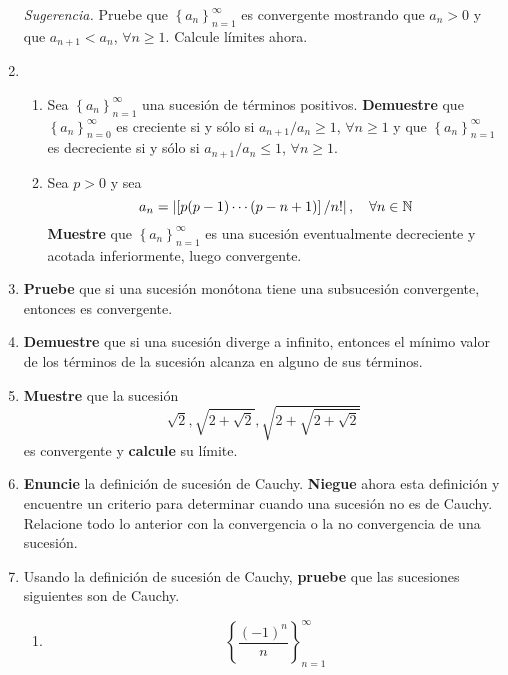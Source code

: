 \documentclass[12pt]{article}
\begin{document}
\begin{enumerate}
    \textit{Sugerencia.} Pruebe que $\left\{a_n\right\}_{n=1}^{\infty}$ es convergente mostrando que $a_n>0$ y que $a_{n+1}<a_n$, $\forall n\geq 1$. Calcule límites ahora.
    \item \begin{enumerate}
        \item Sea $\left\{a_n\right\}_{n=1}^{\infty}$ una sucesión de términos positivos. \textbf{Demuestre} que $\left\{a_n\right\}_{n=0}^{\infty}$ es creciente si y sólo si $a_{n+1}/a_n\geq1$, $\forall n\geq1$ y que $\left\{a_n\right\}_{n=1}^{\infty}$ es decreciente si y sólo si $a_{n+1}/a_n\leq1$, $\forall n\geq1$.
        \item Sea $p>0$ y sea
        \begin{equation*}
            a_n=\left| \left[p(p-1)\cdots(p-n+1)\right]/n! \right|,\quad \forall n\in\mathbb{N}
        \end{equation*}
        \textbf{Muestre} que $\left\{a_n\right\}_{n=1}^{\infty}$ es una sucesión eventualmente decreciente y acotada inferiormente, luego convergente.
    \end{enumerate}
    \item \textbf{Pruebe} que si una sucesión monótona tiene una subsucesión convergente, entonces es convergente.
    \item \textbf{Demuestre} que si una sucesión diverge a infinito, entonces el mínimo valor de los términos de la sucesión alcanza en alguno de sus términos.
    \item \textbf{Muestre} que la sucesión
    \begin{equation*}
        \sqrt{2}, \sqrt{2+\sqrt{2}}, \sqrt{2+\sqrt{2+\sqrt{2}}}
    \end{equation*}
    es convergente y \textbf{calcule} su límite.
    \item \textbf{Enuncie} la definición de sucesión de Cauchy. \textbf{Niegue} ahora esta definición y encuentre un criterio para determinar cuando una sucesión no es de Cauchy. Relacione todo lo anterior con la convergencia o la no convergencia de una sucesión.
    \item Usando la definición de sucesión de Cauchy, \textbf{pruebe} que las sucesiones siguientes son de Cauchy.
    \begin{multicols}{3}
        \begin{enumerate}
            \item \begin{equation*}
                \left\{\frac{(-1)^n}{n}\right\}_{n=1}^{\infty}
            \end{equation*}

\end{enumerate}
\end{multicols}
\end{enumerate}
\end{document}
